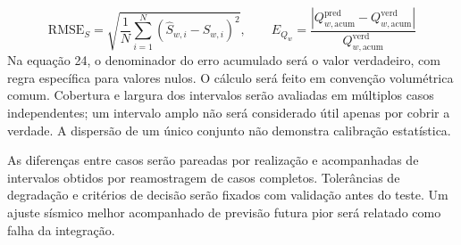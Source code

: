\documentclass[12pt,a4paper]{article}
\begin{document}
\begin{equation}
\mathrm{RMSE}_S=\sqrt{\frac1N\sum_{i=1}^N(\widehat S_{w,i}-S_{w,i})^2},\qquad E_{Q_w}=\frac{|Q_{w,\mathrm{acum}}^{\mathrm{pred}}-Q_{w,\mathrm{acum}}^{\mathrm{verd}}|}{Q_{w,\mathrm{acum}}^{\mathrm{verd}}}
\end{equation}
Na equação 24, o denominador do erro acumulado será o valor verdadeiro, com regra específica para valores nulos. O cálculo será feito em convenção volumétrica comum. Cobertura e largura dos intervalos serão avaliadas em múltiplos casos independentes; um intervalo amplo não será considerado útil apenas por cobrir a verdade. A dispersão de um único conjunto não demonstra calibração estatística.\par
As diferenças entre casos serão pareadas por realização e acompanhadas de intervalos obtidos por reamostragem de casos completos. Tolerâncias de degradação e critérios de decisão serão fixados com validação antes do teste. Um ajuste sísmico melhor acompanhado de previsão futura pior será relatado como falha da integração.\par

\newpage
\end{document}

